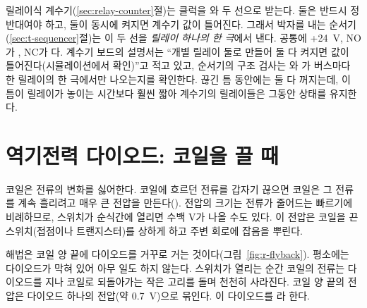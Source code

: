 \Ours 릴레이식 계수기(\ref{sec:relay-counter}절)는 클럭을 와  두 선으로 받는다. 둘은 반드시
정반대여야 하고, 둘이 동시에 켜지면 계수기 값이 틀어진다. 그래서 박자를 내는 순서기(\ref{sec:t-sequencer}절)는 이 두 선을 \emph{릴레이 하나의 한 극}에서 낸다. 공통에
+24~V, NO가 , NC가 다. 계수기 보드의 설명서는 ``개별 릴레이 둘로 만들어 둘 다 켜지면 값이
틀어진다(시뮬레이션에서 확인)''고 적고 있고, 순서기의 구조 검사는 와 가 버스마다 한
릴레이의 한 극에서만 나오는지를 확인한다. 끊긴 틈 동안에는 둘 다 꺼지는데, 이 틈이 릴레이가 놓이는 시간보다
훨씬 짧아 계수기의 릴레이들은 그동안 상태를 유지한다.

\section{역기전력 다이오드: 코일을 끌 때}\label{sec:relay-flyback}

\Why 코일은 전류의 변화를 싫어한다. 코일에 흐르던 전류를 갑자기 끊으면 코일은 그 전류를 계속 흘리려고
매우 큰 전압을 만든다(). 전압의 크기는 전류가 줄어드는 빠르기에 비례하므로,
스위치가 순식간에 열리면 수백 V가 나올 수도 있다. 이 전압은 코일을 끈 스위치(접점이나 트랜지스터)를
상하게 하고 주변 회로에 잡음을 뿌린다.

해법은 코일 양 끝에 다이오드를 거꾸로 거는 것이다(그림~\ref{fig:r-flyback}). 평소에는 다이오드가 막혀 있어
아무 일도 하지 않는다. 스위치가 열리는 순간 코일의 전류는 다이오드를 지나 코일로 되돌아가는 작은 고리를
돌며 천천히 사라진다. 코일 양 끝의 전압은 다이오드 하나의 전압(약 0.7~V)으로 묶인다. 이 다이오드를
라 한다.


